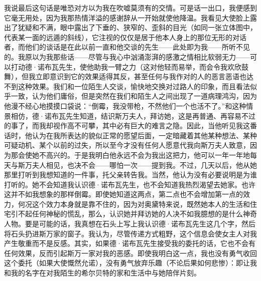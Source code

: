 \par 我说最后这句话是唯恐对方以为我在吹嘘莫须有的交情。可是话一出口，我便感到它毫无用处，因为我那热情洋溢的感谢辞从一开始就使他降温。我看见大使脸上露出了犹疑和不满，眼中露出了下垂的、狭窄的、歪斜的目光（如同一张立体图中，代表某一面的远遁的斜线），它注视的仅仅是居于他本人身上的那位无形的对话者，而他们的谈话是在此以前一直和他交谈的先生——此处即为我——所听不见的。我原以为我那些话——尽管与我心中汹涌澎湃的感激之情相比软弱无力——可以打动德·诺布瓦先生，使他助我一臂之力（这对他轻而易举，而会令我欢欣鼓舞），但我立即意识到它的效果适得其反，甚至任何与我作对的人的恶言恶语也达不到这种效果。我们和一位陌生人交谈，愉快地交换对过路人的印象，而且看法似乎一致，认为他们庸俗，但是突然在我们和陌生人之间出现了一道病理鸿沟，因为他漫不经心地摸摸口袋说：“倒霉，我没带枪，不然他们一个也活不了。”和这种情景相仿，德·诺布瓦先生知道，结识斯万夫人，拜访她，这是再普通、再容易不过的事了，而我却视作高不可攀，其中必有巨大的难言之隐。因此，当他听见我这番话时，他认为在我所表达的貌似正常的愿望后面，一定暗藏着其他某种想法、某种可疑动机、某个以前的过失，所以至今才没有任何人愿意代我向斯万夫人致意，因为那会使她不高兴的。于是我明白他永远不会为我出这把力，他可以一年一年地每天与斯万夫人相见，也决不会——哪怕一次——提到我。不过，几天以后，他从她那里打听到我想知道的一件事，托父亲转告我。当然，他认为没有必要说明是为谁打听的。她不会知道我认识德·诺布瓦先生，也不会知道我热烈渴望去她家。也许这并不如我想象的那样倒霉。即使她知道这两点，第二点也不会增加第一点的效力，何况这个效力本身就是靠不住的，因为对奥黛特来说，既然她本人的生活和住宅引不起任何神秘的慌乱，那么，认识她并拜访她的人决不如我臆想的是什么神奇人物。要是可能的话，我真想在石头上写上我认识德·诺布瓦先生这几个字，然后将石头扔进斯万家的窗子。我认为，尽管传递方式粗野，这个信息会使女主人对我产生敬重而不是反感。其实，如果德·诺布瓦先生接受我的委托的话，它也不会有任何效果，反而引起斯万一家对我的恶感。即使我明白这一点，我也没有勇气收回这个委托（如果大使慨然允诺），没有勇气放弃乐趣（不论后果如何悲惨）：即让我和我的名字在对我陌生的希尔贝特的家和生活中与她陪伴片刻。
